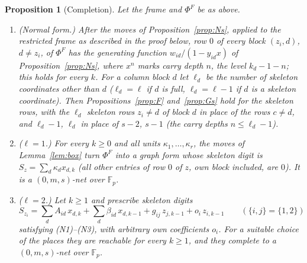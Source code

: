 \documentclass[11pt]{amsart}
\newtheorem{proposition}[theorem]{Proposition}
\theoremstyle{definition}
\theoremstyle{plain}
\newcommand{\F}{\mathbb{F}}
\begin{document}
\begin{proposition}[Completion]\label{prop:skelcomp}
Let the frame and $\Phi^F$ be as above.
\begin{enumerate}
\item[(i)] \emph{(Normal form.)} After the moves of Proposition~\ref{prop:Ns}, applied to the restricted frame as described in the proof below, row $0$ of every block $(z_i,d)$, $d\ne z_i$, of $\Phi^F$ has the generating function $w_{id}/(1-y_{id}x)$ of Proposition~\ref{prop:Ns}, where $x^n$ marks carry depth $n$, the level $k_d-1-n$; this holds for every $k$. For a column block $d$ let $\ell_d$ be the number of skeleton coordinates other than $d$ ($\ell_d=\ell$ if $d$ is full, $\ell_d=\ell-1$ if $d$ is a skeleton coordinate). Then Propositions~\ref{prop:F} and~\ref{prop:Gs} hold for the skeleton rows, with the $\ell_d$ skeleton rows $z_i\ne d$ of block $d$ in place of the rows $c\ne d$, and $\ell_d-1$, $\ell_d$ in place of $s-2$, $s-1$ (the carry depths $n\le\ell_d-1$).
\item[(ii)] \emph{($\ell=1$.)} For every $k\ge0$ and all units $\kappa_1,\dots,\kappa_r$, the moves of Lemma~\ref{lem:box} turn $\Phi^F$ into a graph form whose skeleton digit is $S_z=\sum_d\kappa_dx_{d,k}$ (all other entries of row $0$ of $z$, own block included, are $0$). It is a $(0,m,s)$-net over $\F_p$.
\item[(iii)] \emph{($\ell=2$.)} Let $k\ge1$ and prescribe skeleton digits
\[
S_{z_i}=\sum_dA_{id}\,x_{d,k}+\sum_d\beta_{id}\,x_{d,k-1}+g_{ij}\,z_{j,k-1}+o_i\,z_{i,k-1}\qquad(\{i,j\}=\{1,2\})
\]
satisfying (N1)--(N3), with arbitrary own coefficients $o_i$. For a suitable choice of the places they are reachable for every $k\ge1$, and they complete to a $(0,m,s)$-net over $\F_p$.
\end{enumerate}
\end{proposition}
\end{document}
